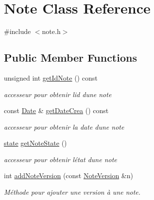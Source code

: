 \hypertarget{class_note}{}\section{Note Class Reference}
\label{class_note}


{\ttfamily \#include $<$note.\+h$>$}

\subsection*{Public Member Functions}
\begin{DoxyCompactItemize}
\item 
\mbox{\label{class_note_a40ceb432567359e26bf865c890323f30}} 
unsigned int \hyperlink{class_note_a40ceb432567359e26bf865c890323f30}{get\+Id\+Note} () const
\begin{DoxyCompactList}\small\item\em accesseur pour obtenir l\textquotesingle{}id d\textquotesingle{}une note \end{DoxyCompactList}\item 
\mbox{\label{class_note_a598ee9613bcc6a062c79792cb7025ee9}} 
const \hyperlink{class_date}{Date} \& \hyperlink{class_note_a598ee9613bcc6a062c79792cb7025ee9}{get\+Date\+Crea} () const
\begin{DoxyCompactList}\small\item\em accesseur pour obtenir la date d\textquotesingle{}une note \end{DoxyCompactList}\item 
\mbox{\label{class_note_a58bc3eb637d334bde81b9f35ad4c7ccc}} 
\hyperlink{note_8h_adc6e5733fc3c22f0a7b2914188c49c90}{state} \hyperlink{class_note_a58bc3eb637d334bde81b9f35ad4c7ccc}{get\+Note\+State} ()
\begin{DoxyCompactList}\small\item\em accesseur pour obtenir l\textquotesingle{}état d\textquotesingle{}une note \end{DoxyCompactList}\item 
int \hyperlink{class_note_a47714d07648fd428150405085ac612b1}{add\+Note\+Version} (const \hyperlink{class_note_version}{Note\+Version} \&n)
\begin{DoxyCompactList}\small\item\em Méthode pour ajouter une version à une note. \end{DoxyCompactList}\item 

\end{DoxyCompactItemize}

